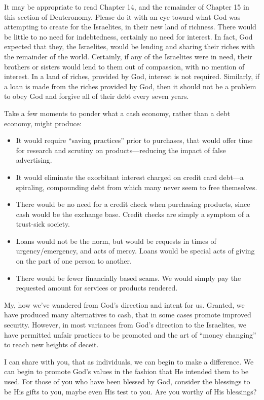 \documentclass[12pt]{memoir}
\begin{document}
It may be appropriate to read Chapter 14, and the remainder of Chapter
15 in this section of Deuteronomy. Please do it with an eye toward
what God was attempting to create for the Israelites, in their new
land of richness. There would be little to no need for indebtedness,
certainly no need for interest. In fact, God expected that they, the
Israelites, would be lending and sharing their riches with the remainder
of the world. Certainly, if any of the Israelites were in need, their
brothers or sisters would lend to them out of compassion, with no
mention of interest. In a land of riches, provided by God, interest
is not required. Similarly, if a loan is made from the riches provided
by God, then it should not be a problem to obey God and forgive all
of their debt every seven years.

Take a few moments to ponder what a cash economy, rather than a debt
economy, might produce: 
\begin{itemize}
\item It would require ``saving practices'' prior to purchases, that would
offer time for research and scrutiny on products---reducing the impact
of false advertising. 
\item It would eliminate the exorbitant interest charged on credit card
debt---a spiraling, compounding debt from which many never seem to
free themselves. 
\item There would be no need for a credit check when purchasing products,
since cash would be the exchange base. Credit checks are simply a
symptom of a trust-sick society. 
\item Loans would not be the norm, but would be requests in times of urgency\slash{}emergency,
and acts of mercy. Loans would be special acts of giving on the part
of one person to another. 
\item There would be fewer financially based scams. We would simply pay
the requested amount for services or products rendered. 
\end{itemize}
My, how we've wandered from God's direction and intent for us. Granted,
we have produced many alternatives to cash, that in some cases promote
improved security. However, in most variances from God's direction
to the Israelites, we have permitted unfair practices to be promoted
and the art of ``money changing'' to reach new heights of deceit. 

I can share with you, that as individuals, we can begin to make a
difference. We can begin to promote God's values in the fashion that
He intended them to be used. For those of you who have been blessed
by God, consider the blessings to be His gifts to you, maybe even
His test to you. Are you worthy of His blessings? 
\end{document}

